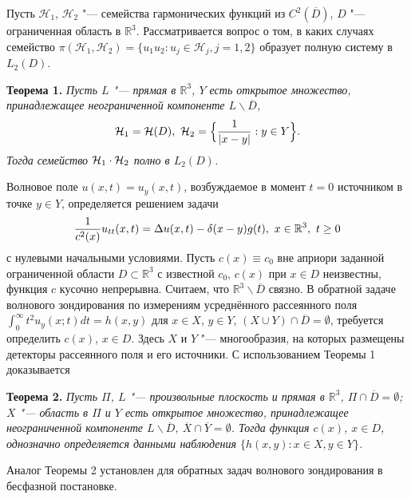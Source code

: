 
\vzmscaption
Пусть ${\mathcal H}_1$, ${\mathcal H}_2$ "--- семейства гармонических функций из $C^2({\overline D})$, $D$ "--- ограниченная область в $\mathbb{R}^3$.
Рассматривается вопрос о том, в каких случаях семейство $\pi({\mathcal H}_1,{\mathcal H}_2)=\{ u_1 u_2: u_j \in {\mathcal H}_j, j=1,2 \}$
образует полную систему в $L_2(D)$.

{\bf Теорема 1.} {\it Пусть $L$ "--- прямая в $\mathbb{R}^3$, $Y$ есть открытое множество, принадлежащее неограниченной компоненте $L\backslash {\overline D}$,
$$
{\cal H}_1={\cal H}(D), \,\, {\cal H}_2=\Bigl\{ {{1}\over{\vert x-y\vert}}: y\in Y \Bigr\}.
$$
Тогда семейство ${\cal H}_1 \cdot {\cal H}_2$ полно в $L_{2}(D)$.
}


Волновое поле $u(x,t)=u_y(x,t)$, возбуждаемое в момент $t=0$ источником в точке $y\in Y$, определяется решением задачи
$$
{{1}\over{c^2(x)}} u_{tt}(x,t)=\Delta
u(x,t)-\delta(x-y) g(t), \,\, x\in \mathbb{R}^3, \,\, t\geq 0
$$
с нулевыми начальными условиями. Пусть $c(x)\equiv c_0$ вне априори заданной ограниченной области $D \subset \mathbb{R}^3$ с известной $c_0$, $c(x)$ при $x\in D$ неизвестны, функция $c$ кусочно непрерывна. Считаем, что ${\mathbb R}^3 \backslash {\overline D}$ связно.
В обратной задаче волнового зондирования по измерениям усреднённого рассеянного поля $\int_0^{\infty} t^2 u_y(x;t)dt=h(x,y)$ для $x\in X$, $y\in Y$, $(X\cup Y)\cap {\overline D}=\emptyset$, требуется определить $c(x)$, $x\in D$. Здесь $X$ и $Y$ "--- многообразия, на которых размещены детекторы рассеянного поля и его источники. С использованием Теоремы 1 доказывается

{\bf Теорема 2.} {\it Пусть $\Pi$, ${L}$ "--- произвольные плоскость и прямая в $\mathbb{R}^3$, $\Pi\cap {\overline D}=\emptyset$; $X$ "--- область в $\Pi$ и $Y$ есть открытое множество, принадлежащее неограниченной компоненте $L\backslash {\overline D}$, ${\overline X} \cap {\overline Y}=\emptyset$. Тогда функция $c(x)$, $x\in D$, однозначно определяется данными наблюдения $\{ h(x,y): x\in X, y\in Y \}$.
}

Аналог Теоремы 2 установлен для обратных задач волнового зондирования в бесфазной постановке.
